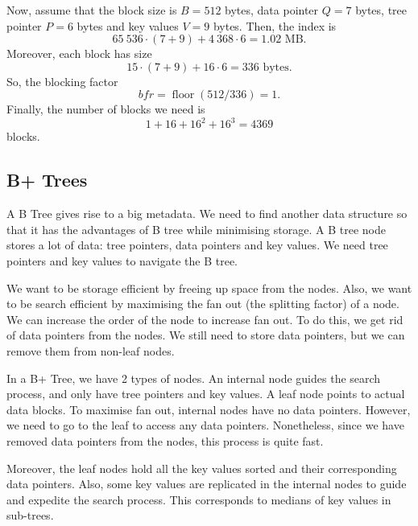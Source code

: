 \documentclass[a4paper, openany]{memoir}
\begin{document}
Now, assume that the block size is $B = 512$ bytes, data pointer $Q = 7$ bytes, tree pointer $P = 6$ bytes and key values $V = 9$ bytes. Then, the index is
\[65 \ 536 \cdot (7 + 9) + 4 \ 368 \cdot 6 = 1.02 \text{ MB}.\]
Moreover, each block has size
\[15 \cdot (7 + 9) + 16 \cdot 6 = 336 \text{ bytes}.\]
So, the blocking factor 
\[\textit{bfr} = \operatorname{floor}(512/336) = 1.\]
Finally, the number of blocks we need is
\[1 + 16 + 16^2 + 16^3 = 4369\]
blocks.

\subsection{B+ Trees}
A B Tree gives rise to a big metadata. We need to find another data structure so that it has the advantages of B tree while minimising storage. A B tree node stores a lot of data: tree pointers, data pointers and key values. We need tree pointers and key values to navigate the B tree. 

We want to be storage efficient by freeing up space from the nodes. Also, we want to be search efficient by maximising the fan out (the splitting factor) of a node. We can increase the order of the node to increase fan out. To do this, we get rid of data pointers from the nodes. We still need to store data pointers, but we can remove them from non-leaf nodes.

In a B+ Tree, we have 2 types of nodes. An internal node guides the search process, and only have tree pointers and key values. A leaf node points to actual data blocks. To maximise fan out, internal nodes have no data pointers. However, we need to go to the leaf to access any data pointers. Nonetheless, since we have removed data pointers from the nodes, this process is quite fast. 

Moreover, the leaf nodes hold all the key values sorted and their corresponding data pointers. Also, some key values are replicated in the internal nodes to guide and expedite the search process. This corresponds to medians of key values in sub-trees.
\end{document}
